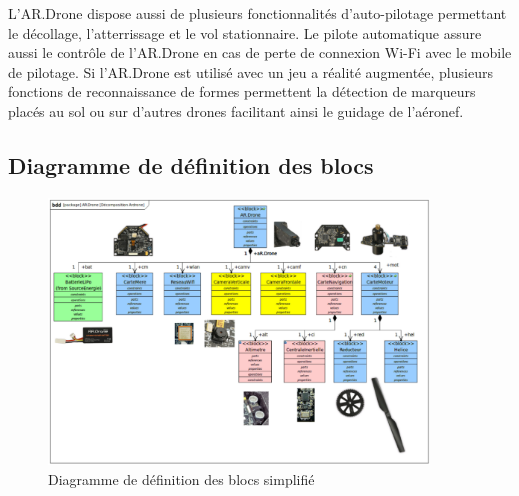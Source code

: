 \documentclass[10pt,fleqn]{article} %
\begin{document}
L'AR.Drone dispose aussi de plusieurs fonctionnalités d'auto-pilotage permettant le décollage, l’atterrissage et le vol stationnaire. Le pilote automatique assure aussi le contrôle de l'AR.Drone en cas de perte de connexion Wi-Fi avec le mobile de pilotage. Si l'AR.Drone est utilisé avec un jeu a réalité augmentée, plusieurs fonctions de reconnaissance de formes permettent la détection de marqueurs placés au sol ou sur d'autres drones facilitant ainsi le guidage de l'aéronef.

\subsection{Diagramme de définition des blocs}

\begin{figure}[h!]
    \centering
    \includegraphics[width=0.9\textwidth]{images/bdd.png}
    \caption{Diagramme de définition des blocs simplifié}
    \label{fig:bdd}
\end{figure}
\end{document}
